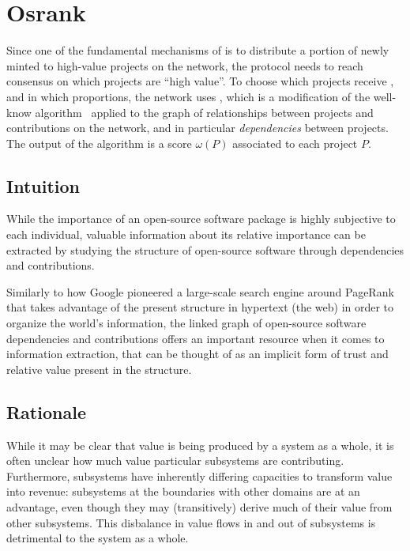 \section{Osrank}
\label{s:osrank}


\def\Graph{\mathsf{Graph}}
\def\proj{\mathsf{proj}}
\def\user{\mathsf{user}}
\def\dep{\mathsf{dep}}
\def\own{\mathsf{own}}
\def\coown{\mathsf{own}^\circ}
\def\contrib{\mathsf{contrib}}
\def\cocontrib{\mathsf{contrib}^\circ}

Since one of the fundamental mechanisms of \oscoin{} is to distribute a portion
of newly minted \oscoin{} to high-value projects on the network, the protocol
needs to reach consensus on which projects are ``high value''. To choose which
projects receive \oscoin{}, and in which proportions, the network uses
\osrank{}, which is a modification of the well-know \pagerank{}
algorithm~\cite{pagerank} applied to the graph of relationships between
projects and contributions on the network, and in particular
\emph{dependencies} between projects. The output of the algorithm is a score
$\omega(P)$ associated to each project $P$.

\subsection{Intuition}

While the importance of an open-source software package is highly subjective to
each individual, valuable information about its relative importance can be
extracted by studying the structure of open-source software through
dependencies and contributions.

Similarly to how Google pioneered a large-scale search engine around PageRank
that takes advantage of the present structure in hypertext (the web) in order
to organize the world’s information, the linked graph of open-source software
dependencies and contributions offers an important resource when it comes to information
extraction, that can be thought of as an implicit form of trust
and relative value present in the structure.

\subsection{Rationale}

While it may be clear that value is being produced by a system as a whole, it is
often unclear how much value particular subsystems are
contributing. Furthermore, subsystems have inherently differing capacities to
transform value into revenue: subsystems at the boundaries with other domains
are at an advantage, even though they may (transitively) derive much of their
value from other subsystems. This disbalance in value flows in and out of
subsystems is detrimental to the system as a whole.

